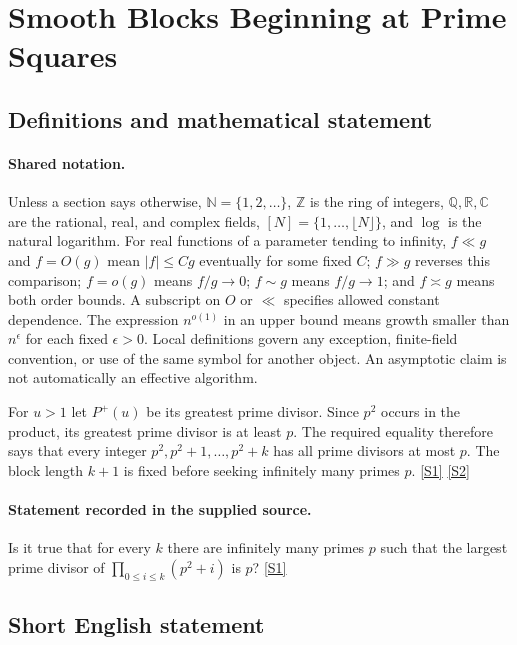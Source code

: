\documentclass[11pt,a4paper]{article}
\newcommand{\N}{\mathbb{N}}
\newcommand{\Z}{\mathbb{Z}}
\newcommand{\Q}{\mathbb{Q}}
\newcommand{\R}{\mathbb{R}}
\newcommand{\C}{\mathbb{C}}
\newcommand{\sref}[2]{\hyperlink{source:#1:#2}{[S#2]}}
\begin{document}
\section{Smooth Blocks Beginning at Prime Squares}\label{statement}


\subsection{Definitions and mathematical statement}

\paragraph{Shared notation.}Unless a section says otherwise, $\N=\{1,2,\ldots\}$,
$\Z$ is the ring of integers, $\Q,\R,\C$ are the rational, real, and complex
fields, $[N]=\{1,\ldots,\lfloor N\rfloor\}$, and $\log$ is the natural
logarithm. For real functions of a parameter tending to infinity,
$f\ll g$ and $f=O(g)$ mean $|f|\leq Cg$ eventually for some fixed $C$;
$f\gg g$ reverses this comparison; $f=o(g)$ means $f/g\to0$;
$f\sim g$ means $f/g\to1$; and $f\asymp g$ means both order bounds.
A subscript on $O$ or $\ll$ specifies allowed constant dependence.
The expression $n^{o(1)}$ in an upper bound means growth smaller than
$n^\epsilon$ for each fixed $\epsilon>0$. Local definitions govern any
exception, finite-field convention, or use of the same symbol for another
object. An asymptotic claim is not automatically an effective algorithm.



For $u>1$ let $P^+(u)$ be its greatest prime divisor. Since $p^2$ occurs in the product, its greatest prime divisor is at least $p$. The required equality therefore says that every integer $p^2,p^2+1,\ldots,p^2+k$ has all prime divisors at most $p$. The block length $k+1$ is fixed before seeking infinitely many primes $p$. \sref{statement}{1} \sref{statement}{2}

\paragraph{Statement recorded in the supplied source.}
Is it true that for every $k$ there are infinitely many primes $p$ such that the largest prime divisor of $ \prod_{0\leq i\leq k}(p^2+i) $ is $p$? \sref{statement}{1}

\subsection{Short English statement}
\end{document}
